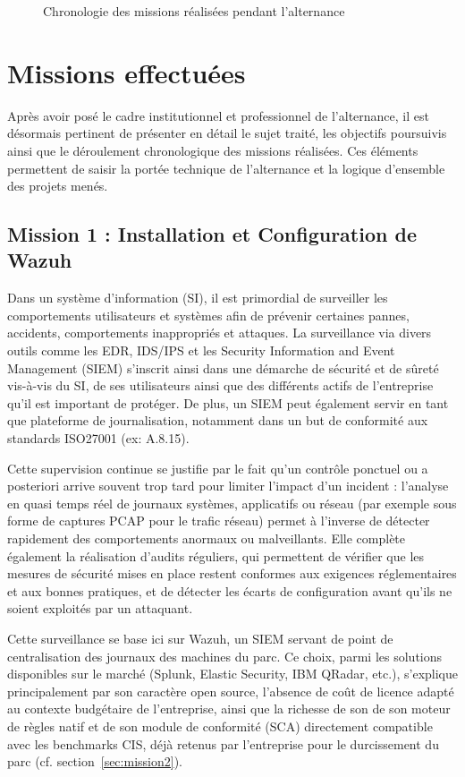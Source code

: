 \documentclass[a4paper, 11pt]{article}
\begin{document}
\begin{figure}[H]
{\begin{ganttchart}
\end{ganttchart}
}%
\caption{Chronologie des missions réalisées pendant l'alternance}
\label{fig:gantt-missions}
\end{figure}




\newpage
\section{Missions effectuées}

Après avoir posé le cadre institutionnel et professionnel de l'alternance, il est désormais pertinent de présenter en détail le sujet traité, les objectifs poursuivis
 ainsi que le déroulement chronologique des missions réalisées. Ces éléments permettent de saisir la portée technique de l'alternance et la logique
d’ensemble des projets menés.

\subsection{Mission 1 : Installation et Configuration de Wazuh}

Dans un système d'information (SI), il est primordial de surveiller les comportements utilisateurs et systèmes afin de prévenir certaines
 pannes, accidents, comportements inappropriés et attaques. La surveillance via divers outils comme les EDR, IDS/IPS et les Security 
 Information and Event Management (SIEM)
  s'inscrit ainsi dans une démarche de sécurité et de sûreté vis-à-vis du SI, de ses utilisateurs ainsi que des différents actifs de 
  l'entreprise qu'il est
  important de protéger. De plus, un SIEM peut également servir en tant que plateforme de journalisation, notamment dans un but de 
  conformité aux standards ISO27001 (ex: A.8.15).
\par\bigskip
Cette supervision continue se justifie par le fait qu'un contrôle ponctuel ou a posteriori arrive souvent trop tard pour limiter 
l'impact d'un incident : l'analyse en quasi temps réel de journaux systèmes, applicatifs ou réseau (par exemple sous forme de captures
 PCAP pour le trafic réseau) permet à l'inverse de détecter rapidement des comportements anormaux ou malveillants. Elle complète également
  la réalisation d'audits réguliers, qui permettent de vérifier que les mesures de sécurité mises en place restent conformes aux exigences 
  réglementaires et aux bonnes pratiques, et de détecter les écarts de configuration avant qu'ils ne soient exploités par un attaquant.
\par\bigskip
Cette surveillance se base ici sur Wazuh, un SIEM servant de point de centralisation des journaux des machines du parc. Ce choix, 
parmi les solutions disponibles sur le marché (Splunk, Elastic Security, IBM QRadar, etc.), s'explique principalement par son caractère 
open source, l'absence de coût de licence adapté au contexte budgétaire de l'entreprise, ainsi que la richesse de son de son moteur de règles natif et de
 son module de conformité (SCA) directement compatible avec les benchmarks CIS, déjà retenus par l'entreprise pour le durcissement du parc
  (cf. section~\ref{sec:mission2}).
\end{document}
